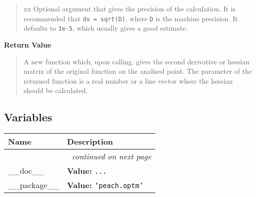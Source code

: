 \begin{boxedminipage}{\funcwidth}
\begin{quote}
\begin{Ventry}{xx}
Optional argument that gives the precision of the calculation. It is
recommended that \texttt{dx = sqrt(D)}, where \texttt{D} is the machine precision.
It defaults to \texttt{1e-5}, which usually gives a good estimate.
        \end{Ventry}

      \end{quote}

      \textbf{Return Value}
    \vspace{-1ex}

      \begin{quote}

A new function which, upon calling, gives the second derivative or hessian
matrix of the original function on the analised point. The parameter of
the returned function is a real number or a line vector where the hessian
should be calculated.
      \end{quote}

    \end{boxedminipage}



  \subsection{Variables}

    \vspace{-1cm}
\hspace{\varindent}\begin{longtable}{|p{\varnamewidth}|p{\vardescrwidth}|l}
\cline{1-2}
\cline{1-2} \centering \textbf{Name} & \centering \textbf{Description}& \\
\cline{1-2}
\endhead\cline{1-2}\multicolumn{3}{r}{\small\textit{continued on next page}}\\\endfoot\cline{1-2}
\endlastfoot\raggedright \_\-\_\-d\-o\-c\-\_\-\_\- & \raggedright \textbf{Value:} 
{\tt \texttt{...}}&\\
\cline{1-2}
\raggedright \_\-\_\-p\-a\-c\-k\-a\-g\-e\-\_\-\_\- & \raggedright \textbf{Value:} 
{\tt \texttt{'}\texttt{peach.optm}\texttt{'}}&\\
\cline{1-2}
\end{longtable}



